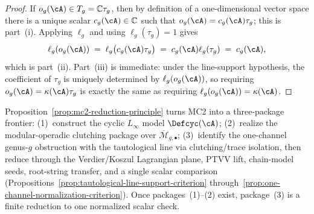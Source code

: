 \begin{proof}
If $o_g(\cA)\in T_g=\mathbb{C}\tau_g$, then by definition of a
one-dimensional vector space there is a unique scalar
$c_g(\cA)\in\mathbb{C}$ such that
$o_g(\cA)=c_g(\cA)\tau_g$; this is part~\textup{(i)}.
Applying $\ell_g$ and using $\ell_g(\tau_g)=1$ gives
\[
\ell_g(o_g(\cA))
\;=\;
\ell_g\bigl(c_g(\cA)\tau_g\bigr)
\;=\;
c_g(\cA)\ell_g(\tau_g)
\;=\;
c_g(\cA),
\]
which is part~\textup{(ii)}.
Part~\textup{(iii)} is immediate: under the line-support hypothesis,
the coefficient of $\tau_g$ is uniquely determined by
$\ell_g(o_g(\cA))$, so requiring
$o_g(\cA)=\kappa(\cA)\tau_g$ is exactly the same as requiring
$\ell_g(o_g(\cA))=\kappa(\cA)$.
\end{proof}

\begin{remark}
\label{rem:mc2-reduction-consequence}
Proposition~\ref{prop:mc2-reduction-principle} turns MC2 into a
three-package frontier:
(1)~construct the cyclic $L_\infty$ model $\Defcyc(\cA)$;
(2)~realize the modular-operadic clutching package over
$\overline{\mathcal{M}}_{g,\bullet}$;
(3)~identify the one-channel genus-$g$ obstruction with the
tautological line via clutching/trace isolation, then reduce
through the Verdier/Koszul Lagrangian plane, PTVV lift,
chain-model seeds, root-string transfer, and a single scalar
comparison
(Propositions~\ref{prop:tautological-line-support-criterion}
through~\ref{prop:one-channel-normalization-criterion}).
Once packages~(1)--(2) exist, package~(3) is a finite
reduction to one normalized scalar check.
\end{remark}

